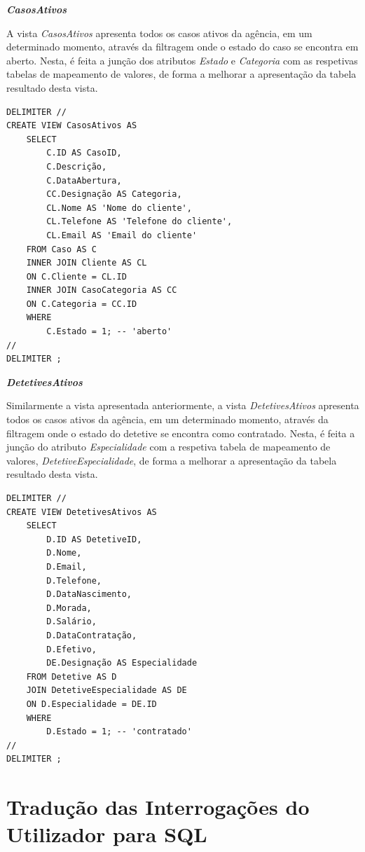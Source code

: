 \documentclass[a4paper,12pt]{scrreprt}
\begin{document}
\textit{\textbf{CasosAtivos}}

A vista \textit{CasosAtivos} apresenta todos os casos ativos da agência, em um determinado momento, através da filtragem onde o estado do caso se encontra em aberto. Nesta, é feita a junção dos atributos \textit{Estado} e \textit{Categoria} com as respetivas tabelas de mapeamento de valores, de forma a melhorar a apresentação da tabela resultado desta vista.

\vspace{0.4cm}
\begin{lstlisting}
DELIMITER //
CREATE VIEW CasosAtivos AS
    SELECT
        C.ID AS CasoID,
        C.Descrição,
        C.DataAbertura,
        CC.Designação AS Categoria,
        CL.Nome AS 'Nome do cliente',
        CL.Telefone AS 'Telefone do cliente',
        CL.Email AS 'Email do cliente'
    FROM Caso AS C
    INNER JOIN Cliente AS CL
    ON C.Cliente = CL.ID
    INNER JOIN CasoCategoria AS CC
    ON C.Categoria = CC.ID
    WHERE
        C.Estado = 1; -- 'aberto'
//
DELIMITER ;
\end{lstlisting}

\clearpage

\textit{\textbf{DetetivesAtivos}}

Similarmente a vista apresentada anteriormente, a vista \textit{DetetivesAtivos} apresenta todos os casos ativos da agência, em um determinado momento,
através da filtragem onde o estado do detetive se encontra como contratado. Nesta, é feita a junção do atributo \textit{Especialidade} com a respetiva tabela de mapeamento de valores, \textit{DetetiveEspecialidade}, de forma a melhorar a apresentação da tabela resultado desta vista.

\vspace{0.4cm}
\begin{lstlisting}
DELIMITER //
CREATE VIEW DetetivesAtivos AS
    SELECT
        D.ID AS DetetiveID,
        D.Nome,
        D.Email,
        D.Telefone,
        D.DataNascimento,
        D.Morada,
        D.Salário,
        D.DataContratação,
        D.Efetivo,
        DE.Designação AS Especialidade
    FROM Detetive AS D
    JOIN DetetiveEspecialidade AS DE
    ON D.Especialidade = DE.ID
    WHERE
        D.Estado = 1; -- 'contratado'
//
DELIMITER ;
\end{lstlisting}

\clearpage

\section{Tradução das Interrogações do Utilizador para SQL}
\end{document}
